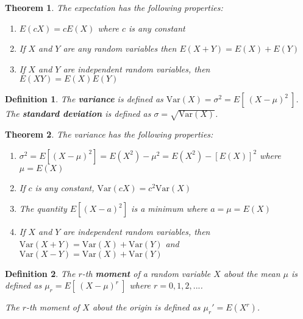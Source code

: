 \documentclass[12pt,twoside]{report}
\theoremstyle{thmstyle}
\newtheorem{defn}{Definition}
\newtheorem{thm}{Theorem}
\begin{document}
\begin{samepage}
\begin{thm}
    The expectation has the following properties:

    \begin{enumerate}
        \item $E(c X) = c E(X)$ where $c$ is any constant
        \item If $X$ and $Y$ are any random variables then $E(X + Y) = E(X) + E(Y)$
        \item If $X$ and $Y$ are independent random variables, then $E(XY) = E(X)E(Y)$
    \end{enumerate}
\end{thm}
\end{samepage}

\begin{defn}
    The \textbf{variance} is defined as $\text{Var} (X) = \sigma ^2 = E[ \  (X - \mu)^2 \  ]$.
    The \textbf{standard deviation} is defined as $\sigma = \sqrt{\text{Var} (X)}$.
\end{defn}

\begin{samepage}
\begin{thm}
    The variance has the following properties:

    \begin{enumerate}
        \item $\sigma ^2 = E\left [ \left (X - \mu \right ) ^2 \right ] = E\left (X ^2\right ) - \mu ^2 = E\left (X ^2\right ) - \left [E\left (X\right )\right ] ^2$ where $\mu = E\left (X\right )$
        \item If $c$ is any constant, $\text{Var}(cX) = c^2 \text{Var}(X)$
        \item The quantity $E[ (X - a)^2 ]$ is a minimum where $a = \mu = E(X)$
        \item If $X$ and $Y$ are independent random variables, then \\ $\text{Var}(X+Y) = \text{Var}(X) + \text{Var}(Y)$ and $\text{Var}(X-Y) = \text{Var}(X) + \text{Var}(Y)$
    \end{enumerate}
\end{thm}
\end{samepage}

\begin{defn}
    The $r$-th \textbf{moment} of a random variable $X$ about the mean $\mu$ is defined as $\mu_r = E[\  (X - \mu)^r \ ]$ where $r=0, 1, 2, ...$.

    The $r$-th moment of $X$ about the origin is defined as $\mu_r ' = E(X^r)$.
\end{defn}
\end{document}
